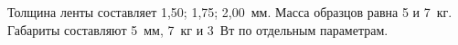 Толщина ленты составляет 1,50; 1,75; 2,00~мм.
Масса образцов равна 5 и 7~кг.
Габариты составляют 5~мм, 7~кг и 3~Вт по отдельным параметрам.

